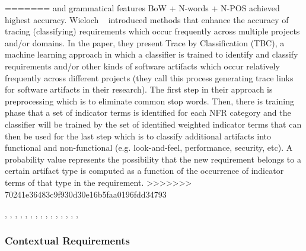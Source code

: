=======
and grammatical features BoW + N-words + N-POS achieved highest accuracy. 
Wieloch \etal~\cite{Wieloch:2013} introduced methods that enhance the accuracy of tracing (classifying) requirements which occur frequently across multiple projects and/or domains. In the paper, they present Trace by  Classification (TBC),  a machine learning approach in which a classifier is trained to identify and classify requirements and/or other kinds of software artifacts which occur relatively frequently across different projects (they call this process generating trace links for software artifacts in their research). The first step in their approach is preprocessing which is to eliminate common stop words. Then, there is training phase that a set of indicator terms is identified for each NFR category and the classifier will be trained by the set of identified weighted indicator terms that can then be used for the last step which is to classify additional artifacts into functional and non-functional (e.g. look-and-feel, performance, security, etc). A probability value represents the possibility that the new requirement belongs to a certain artifact type is computed as a function of the occurrence of indicator terms of that type in the requirement. 
>>>>>>> 70241e36483c9f930d30e16b5faa0196fdd34793


\cite{Deocadez:2017}, \cite{Kurtanovic:2017}, \cite{Guzman:2017},
\cite{Abad:2017}, \cite{Dekhtyar:2017}, \cite{Rashwan:2012}, \cite{Lu:2017},
\cite{Hayes:2014}, \cite{Williams:2017}, \cite{Garzoli:2013},
\cite{Casamayor:2010}, \cite{Wang:2016}, \cite{Hussain:2012}, \cite{Jiang:2014},
\cite{Jha:2017}, \cite{Pinquie:2015}



\subsubsection{Contextual Requirements} 

